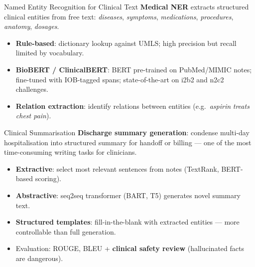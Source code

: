 \begin{v3topic}{Named Entity Recognition for Clinical Text}
    \textbf{Medical NER} extracts structured clinical entities from free text: \textit{diseases}, \textit{symptoms}, \textit{medications}, \textit{procedures}, \textit{anatomy}, \textit{dosages}.
    \begin{itemize}
        \item \textbf{Rule-based}: dictionary lookup against UMLS; high precision but recall limited by vocabulary.
        \item \textbf{BioBERT / ClinicalBERT}: BERT pre-trained on PubMed/MIMIC notes; fine-tuned with IOB-tagged spans; state-of-the-art on i2b2 and n2c2 challenges.
        \item \textbf{Relation extraction}: identify relations between entities (e.g.\ \textit{aspirin} \textit{treats} \textit{chest pain}).
    \end{itemize}
    \textsuperscript{\cite[][p.~466]{juhnArtificialIntelligenceNLP2020}}

\end{v3topic}
\begin{v3topic}{Clinical Summarisation}
    \textbf{Discharge summary generation}: condense multi-day hospitalisation into structured summary for handoff or billing — one of the most time-consuming writing tasks for clinicians.
    \begin{itemize}
        \item \textbf{Extractive}: select most relevant sentences from notes (TextRank, BERT-based scoring).
        \item \textbf{Abstractive}: seq2seq transformer (BART, T5) generates novel summary text.
        \item \textbf{Structured templates}: fill-in-the-blank with extracted entities — more controllable than full generation.
        \item Evaluation: ROUGE, BLEU + \textbf{clinical safety review} (hallucinated facts are dangerous).
    \end{itemize}

\end{v3topic}
